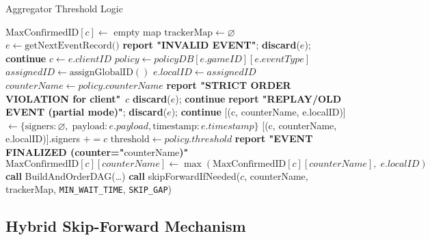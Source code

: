 \documentclass[11pt]{article}
\begin{document}
\begin{algorithm}[H]
\scriptsize
\caption{Aggregator Threshold Logic}
\label{algo:aggregatorThresholdMultiModified}
\begin{algorithmic}[1]
    \State $\text{MaxConfirmedID}[c] \gets$ empty map 
  \EndFor
  \State $\text{trackerMap} \gets \varnothing$
    \State $e \gets \text{getNextEventRecord()}$
      \State \textbf{report "INVALID EVENT"}; \textbf{discard}($e$); \textbf{continue}
    \EndIf
    \State $c \gets e.clientID$
    \State $policy \gets policyDB[e.gameID][e.eventType]$
      \State $assignedID \gets \text{assignGlobalID}()$
      \State $e.localID \gets assignedID$
    \EndIf
    \State $counterName \gets policy.counterName$
        \State \textbf{report "STRICT ORDER VIOLATION for client"}~$c$
        \State \textbf{discard}($e$); \textbf{continue}
      \EndIf
    \Else
        \State \textbf{report "REPLAY/OLD EVENT (partial mode)"}; \textbf{discard}($e$); \textbf{continue}
      \EndIf
    \EndIf
      \State {}[(c, counterName, e.localID)] $\gets \{\text{signers} : \varnothing,\;\text{payload}: e.payload, \text{timestamp}: e.timestamp\}$
    \EndIf
    \State {}[(c, counterName, e.localID)].signers $\mathrel{+}= c$
    \State $\text{threshold} \gets policy.threshold$
      \State \textbf{report "EVENT FINALIZED (counter="}counterName\textbf{)"} 
      \State $\text{MaxConfirmedID}[c][counterName] \gets \max(\text{MaxConfirmedID}[c][counterName],\; e.localID)$
      \State \textbf{call} BuildAndOrderDAG(\ldots)
    \EndIf
    \State \textbf{call} skipForwardIfNeeded($c$, counterName, trackerMap, \texttt{MIN\_WAIT\_TIME}, \texttt{SKIP\_GAP})
  \EndWhile
\EndProcedure
\end{algorithmic}
\end{algorithm}

\subsection{Hybrid Skip-Forward Mechanism}
\label{sec:skipForward}
\end{document}

